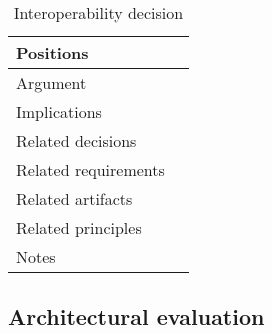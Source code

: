 \begin{table}[H]
\begin{tabular}{|l|l|}
Positions            &                                                                                                                                                                                                                                                             \\ \hline
Argument             &                                                                                                                                                                                                                                                             \\ \hline
Implications         &                                                                                                                                                                                                                                                             \\ \hline
Related decisions    &                                                                                                                                                                                                                                                             \\ \hline
Related requirements &                                                                                                                                                                                                                                                             \\ \hline
Related artifacts    &                                                                                                                                                                                                                                                             \\ \hline
Related principles   &                                                                                                                                                                                                                                                             \\ \hline
Notes                &                                                                                                                                                                                                                                                             \\ \hline
\end{tabular}
\caption{Interoperability decision}
\label{my-label}
\end{table}


\subsection{Architectural evaluation}